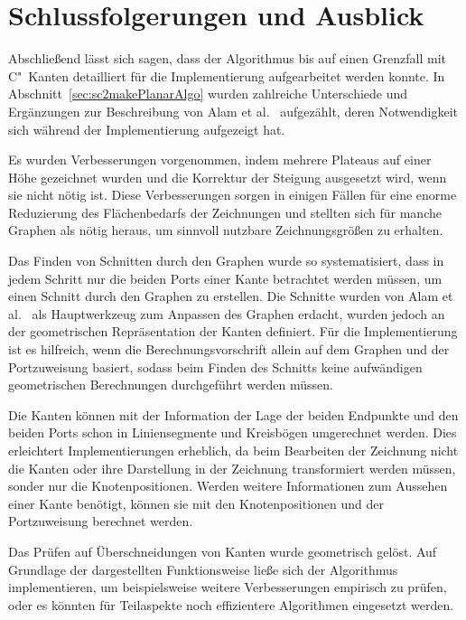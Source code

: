 \documentclass[a4paper]{scrreprt}
\theoremstyle{definition}
\begin{document}
\chapter{Schlussfolgerungen und Ausblick}
\label{chap:outro}

Abschließend lässt sich sagen, dass der Algorithmus bis auf einen Grenzfall mit C"~Kanten detailliert für die Implementierung aufgearbeitet werden konnte. In Abschnitt~\ref{sec:sc2makePlanarAlgo} wurden zahlreiche Unterschiede und Ergänzungen zur Beschreibung von Alam et al.~\cite{smooth-13} aufgezählt, deren Notwendigkeit sich während der Implementierung aufgezeigt hat.

Es wurden Verbesserungen vorgenommen, indem mehrere Plateaus auf einer Höhe gezeichnet wurden und die Korrektur der Steigung ausgesetzt wird, wenn sie nicht nötig ist. Diese Verbesserungen sorgen in einigen Fällen für eine enorme Reduzierung des Flächenbedarfs der Zeichnungen und stellten sich für manche Graphen als nötig heraus, um sinnvoll nutzbare Zeichnungsgrößen zu erhalten.

Das Finden von Schnitten durch den Graphen wurde so systematisiert, dass in jedem Schritt nur die beiden Ports einer Kante betrachtet werden müssen, um einen Schnitt durch den Graphen zu erstellen. Die Schnitte wurden von Alam et al.~\cite{smooth-13} als Hauptwerkzeug zum Anpassen des Graphen erdacht, wurden jedoch an der geometrischen Repräsentation der Kanten definiert. Für die Implementierung ist es hilfreich, wenn die Berechnungsvorschrift allein auf dem Graphen und der Portzuweisung basiert, sodass beim Finden des Schnitts keine aufwändigen geometrischen Berechnungen durchgeführt werden müssen.

Die Kanten können mit der Information der Lage der beiden Endpunkte und den beiden Ports schon in Liniensegmente und Kreisbögen umgerechnet werden. Dies erleichtert Implementierungen erheblich, da beim Bearbeiten der Zeichnung nicht die Kanten oder ihre Darstellung in der Zeichnung transformiert werden müssen, sonder nur die Knotenpositionen. Werden weitere Informationen zum Aussehen einer Kante benötigt, können sie mit den Knotenpositionen und der Portzuweisung berechnet werden.

Das Prüfen auf Überschneidungen von Kanten wurde geometrisch gelöst. Auf Grundlage der dargestellten Funktionsweise ließe sich der Algorithmus implementieren, um beispielsweise weitere Verbesserungen empirisch zu prüfen, oder es könnten für Teilaspekte noch effizientere Algorithmen eingesetzt werden.
\end{document}
